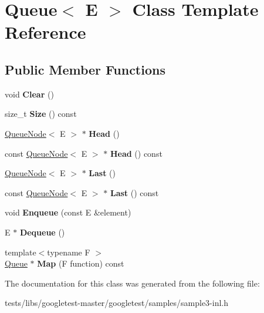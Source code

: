 \hypertarget{classQueue}{}\section{Queue$<$ E $>$ Class Template Reference}
\label{classQueue}
\subsection*{Public Member Functions}
\begin{DoxyCompactItemize}
\item 
\mbox{\label{classQueue_acfdd5f9f7e936ca30dcf877370ef9510}} 
void {\bfseries Clear} ()
\item 
\mbox{\label{classQueue_abc4d78b5f66041011c5590bf703847b0}} 
size\+\_\+t {\bfseries Size} () const
\item 
\mbox{\label{classQueue_a71aa0154ef75bb87a53b6af1829fcd5e}} 
\hyperlink{classQueueNode}{Queue\+Node}$<$ E $>$ $\ast$ {\bfseries Head} ()
\item 
\mbox{\label{classQueue_a6c906075e0ad2d1f0634990aa106395e}} 
const \hyperlink{classQueueNode}{Queue\+Node}$<$ E $>$ $\ast$ {\bfseries Head} () const
\item 
\mbox{\label{classQueue_a430aca3d3b9f5fd588b215028d134b74}} 
\hyperlink{classQueueNode}{Queue\+Node}$<$ E $>$ $\ast$ {\bfseries Last} ()
\item 
\mbox{\label{classQueue_a7c8c2c64700dfe1df8bf266572cf101a}} 
const \hyperlink{classQueueNode}{Queue\+Node}$<$ E $>$ $\ast$ {\bfseries Last} () const
\item 
\mbox{\label{classQueue_abaa2e7175457307bca74f5562cbdaaa9}} 
void {\bfseries Enqueue} (const E \&element)
\item 
\mbox{\label{classQueue_a434d465001c3078e999f7a89a8af84c0}} 
E $\ast$ {\bfseries Dequeue} ()
\item 
\mbox{\label{classQueue_a904a696292fc593adc6fd21fb229d760}} 
{\footnotesize template$<$typename F $>$ }\\\hyperlink{classQueue}{Queue} $\ast$ {\bfseries Map} (F function) const
\end{DoxyCompactItemize}


The documentation for this class was generated from the following file\+:\begin{DoxyCompactItemize}
\item 
tests/libs/googletest-\/master/googletest/samples/sample3-\/inl.\+h\end{DoxyCompactItemize}
